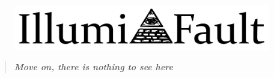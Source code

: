 \documentclass[9pt]{extarticle}
\begin{document}

\pagestyle{fancy}
\fancyhf{}
\rhead{\today}
\addtolength\footskip{-15px}


\begin{figure}[H]
\centering\vspace{0.5cm}\includegraphics[width=0.8\linewidth]{illumnifault.png}
\end{figure}


\vspace{-15px}
\begin{quote}
\centering
\textbf{\textit{Move on, there is nothing to see here}}
\end{quote}
\vspace{10px}

\end{document}
